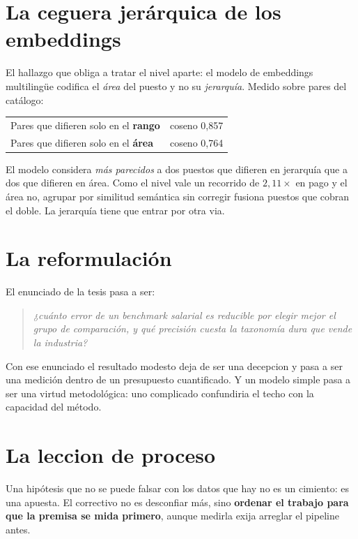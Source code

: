 \documentclass[12pt,a4paper]{report}
\begin{document}
\section{La ceguera jerárquica de los embeddings}

El hallazgo que obliga a tratar el nivel aparte: el modelo de embeddings
multilingüe codifica el \emph{área} del puesto y no su \emph{jerarquía}. Medido
sobre pares del catálogo:

\begin{table}[h]
\centering
\begin{tabular}{lr}
\toprule
Pares que difieren solo en el \textbf{rango} & coseno 0,857 \\
Pares que difieren solo en el \textbf{área} & coseno 0,764 \\
\bottomrule
\end{tabular}
\end{table}

El modelo considera \emph{más parecidos} a dos puestos que difieren en jerarquía
que a dos que difieren en área. Como el nivel vale un recorrido de
$2{,}11\times$ en pago y el área no, agrupar por similitud semántica sin corregir
fusiona puestos que cobran el doble. La jerarquía tiene que entrar por otra via.

\section{La reformulación}

El enunciado de la tesis pasa a ser:

\begin{quote}
\emph{¿cuánto error de un benchmark salarial es reducible por elegir mejor el
grupo de comparación, y qué precisión cuesta la taxonomía dura que vende la
industria?}
\end{quote}

Con ese enunciado el resultado modesto deja de ser una decepcion y pasa a ser una
medición dentro de un presupuesto cuantificado. Y un modelo simple pasa a ser una
virtud metodológica: uno complicado confundiria el techo con la capacidad del
método.

\section{La leccion de proceso}

Una hipótesis que no se puede falsar con los datos que hay no es un cimiento: es
una apuesta. El correctivo no es desconfiar más, sino \textbf{ordenar el trabajo
para que la premisa se mida primero}, aunque medirla exija arreglar el pipeline
antes.
\end{document}
